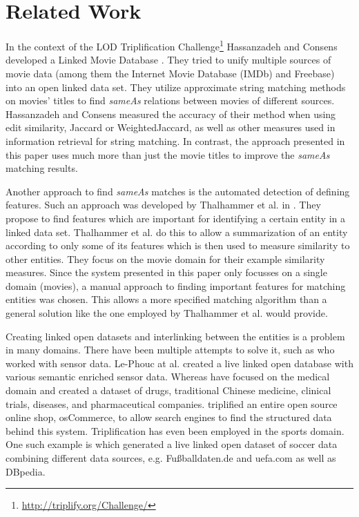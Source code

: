 \section{Related Work}
\label{sec_related_work}

In the context of the LOD Triplification Challenge\footnote{\url{http://triplify.org/Challenge/}} Hassanzadeh and Consens developed a Linked Movie Database \cite{LMDB}.
They tried to unify multiple sources of movie data (among them the Internet Movie Database (IMDb) and Freebase) into an open linked data set.
They utilize approximate string matching methods on movies' titles to find \textit{sameAs} relations between movies of different sources.
Hassanzadeh and Consens measured the accuracy of their method when using edit similarity, Jaccard or WeightedJaccard, as well as other measures used in information retrieval for string matching.
In contrast, the approach presented in this paper uses much more than just the movie titles to improve the \textit{sameAs} matching results.

Another approach to find \textit{sameAs} matches is the automated detection of defining features.
Such an approach was developed by Thalhammer et al. in \cite{MovieSummarization}.
They propose to find features which are important for identifying a certain entity in a linked data set.
Thalhammer et al. do this to allow a summarization of an entity according to only some of its features which is then used to measure similarity to other entities.
They focus on the movie domain for their example similarity measures.
Since the system presented in this paper only focusses on a single domain (movies), a manual approach to finding important features for matching entities was chosen.
This allows a more specified matching algorithm than a general solution like the one employed by Thalhammer et al. would provide.

Creating linked open datasets and interlinking between the entities is a problem in many domains.
There have been multiple attempts to solve it, such as \cite{SensorData} who worked with sensor data.
Le-Phouc at al. created a live linked open database with various semantic enriched sensor data.
Whereas \cite{openDrugData} have focused on the medical domain and created a dataset of drugs, traditional Chinese medicine, clinical trials, diseases, and pharmaceutical companies.
\cite{osCommerce} triplified an entire open source online shop, osCommerce, to allow search engines to find the structured data behind this system.
Triplification has even been employed in the sports domain.
One such example is \cite{smm} which generated a live linked open dataset of soccer data combining different data sources, e.g. Fußballdaten.de and uefa.com as well as DBpedia.


